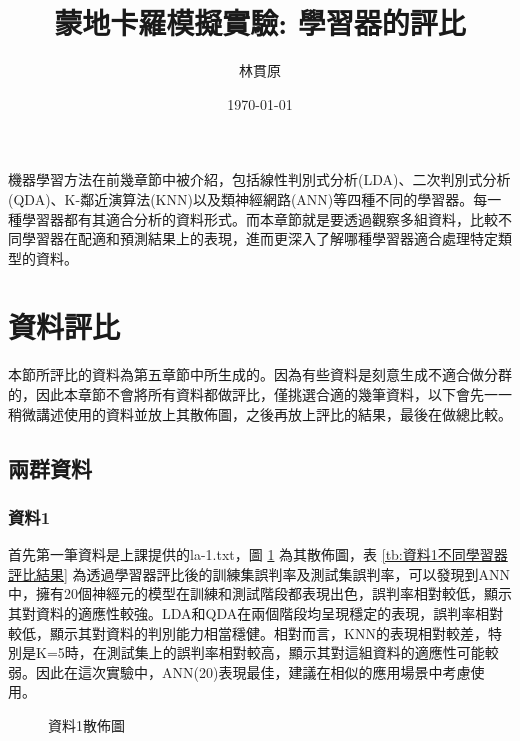 \documentclass[12pt, a4paper]{article}
\title{蒙地卡羅模擬實驗: 學習器的評比}
\author{{\KT 林貫原}}
\date{{\R \today }}
\begin{document}
\renewcommand{\tablename}{表}	
\renewcommand{\figurename}{圖}
\maketitle
\fontsize{12}{22pt}\selectfont 


機器學習方法在前幾章節中被介紹，包括線性判別式分析(LDA)、二次判別式分析(QDA)、K-鄰近演算法(KNN)以及類神經網路(ANN)等四種不同的學習器。每一種學習器都有其適合分析的資料形式。而本章節就是要透過觀察多組資料，比較不同學習器在配適和預測結果上的表現，進而更深入了解哪種學習器適合處理特定類型的資料。
\section{資料評比}
本節所評比的資料為第五章節中所生成的。因為有些資料是刻意生成不適合做分群的，因此本章節不會將所有資料都做評比，僅挑選合適的幾筆資料，以下會先一一稍微講述使用的資料並放上其散佈圖，之後再放上評比的結果，最後在做總比較。

\subsection{兩群資料}
\subsubsection{資料1}
首先第一筆資料是上課提供的la-1.txt，圖 \ref{fig:資料1散佈圖} 為其散佈圖，表 \ref{tb:資料1不同學習器評比結果} 為透過學習器評比後的訓練集誤判率及測試集誤判率，可以發現到ANN中，擁有20個神經元的模型在訓練和測試階段都表現出色，誤判率相對較低，顯示其對資料的適應性較強。LDA和QDA在兩個階段均呈現穩定的表現，誤判率相對較低，顯示其對資料的判別能力相當穩健。相對而言，KNN的表現相對較差，特別是K=5時，在測試集上的誤判率相對較高，顯示其對這組資料的適應性可能較弱。因此在這次實驗中，ANN(20)表現最佳，建議在相似的應用場景中考慮使用。

\begin{figure}[H]
    \caption{資料1散佈圖}
    \label{fig:資料1散佈圖}
\end{figure}
\end{document}
